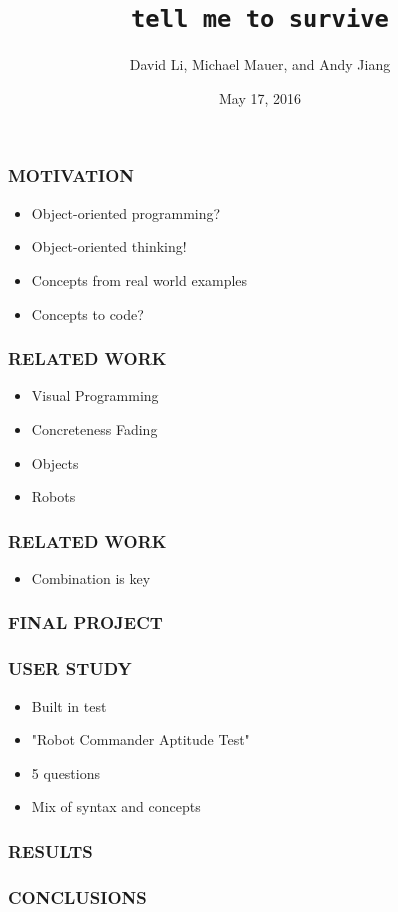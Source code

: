 \documentclass{beamer}
\title{\texttt{tell me to survive}}
\author{David Li, Michael Mauer, and Andy Jiang}
\institute{Cornell University}
\date{May 17, 2016}
\let\theframetitle\frametitle
\renewcommand\frametitle[1]{\theframetitle{\MakeUppercase{#1}}}
\begin{document}
\frame{\titlepage}

\begin{frame}
\frametitle{Motivation}


\begin{itemize}[<+->]
\item Object-oriented programming?
\item Object-oriented thinking!
\item Concepts from real world examples
\item Concepts to code?
\end{itemize}
\end{frame}

\begin{frame}
\frametitle{Related Work}
\begin{itemize}[<+->]
\item Visual Programming
\item Concreteness Fading
\item Objects
\item Robots
\end{itemize}
\end{frame}

\begin{frame}
\frametitle{Related Work}
\begin{itemize}[<+->]
\item Combination is key
\end{itemize}
\end{frame}

\begin{frame}
\frametitle{Final Project}
\end{frame}

\begin{frame}
\frametitle{User Study}
\begin{itemize}[<+->]
\item Built in test
\item "Robot Commander Aptitude Test"
\item 5 questions
\item Mix of syntax and concepts
\end{itemize}
\end{frame}

\begin{frame}
\frametitle{Results}
\end{frame}

\begin{frame}
\frametitle{Conclusions}
\end{frame}
\end{document}
